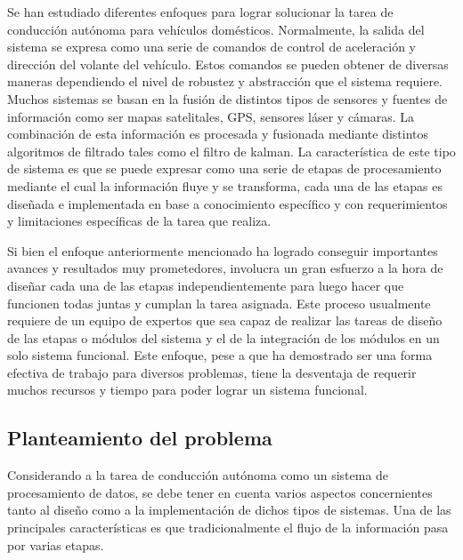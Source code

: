 \documentclass[12pt,letterpaper]{article}
\begin{document}
Se han estudiado diferentes enfoques para lograr solucionar la tarea de 
conducción autónoma para vehículos domésticos. Normalmente, la salida del 
sistema se expresa como una serie de comandos de control de aceleración y dirección 
del volante del vehículo. Estos comandos se pueden obtener de diversas maneras dependiendo 
el nivel de robustez y abstracción que el sistema requiere. Muchos sistemas 
se basan en la fusión de distintos tipos de sensores y fuentes de información como ser 
mapas satelitales, GPS, sensores láser y cámaras. La combinación de esta información 
es procesada y fusionada mediante distintos algoritmos de filtrado tales como el filtro de kalman. 
La característica de este tipo de sistema es que se puede expresar como una serie de etapas 
de procesamiento mediante el cual la información fluye y se transforma, cada una de las etapas es 
diseñada e implementada en base a conocimiento específico y con requerimientos y limitaciones específicas 
de la tarea que realiza. 


Si bien el enfoque anteriormente mencionado ha logrado conseguir importantes avances y resultados 
muy prometedores, involucra un gran esfuerzo a la hora de diseñar cada una de las etapas independientemente 
para luego hacer que funcionen todas juntas y cumplan la tarea asignada. Este proceso usualmente requiere 
de un equipo de expertos que sea capaz de realizar las tareas de diseño de las etapas o módulos del sistema 
y el de la integración de los módulos en un solo sistema funcional. Este enfoque, pese a que ha demostrado ser 
una forma efectiva de trabajo para diversos problemas, tiene la desventaja de requerir muchos 
recursos y tiempo para poder lograr un sistema funcional. 


%
\subsection{Planteamiento del problema}

% 

Considerando a la tarea de conducción autónoma como un sistema de procesamiento de datos, se debe tener en 
cuenta varios aspectos concernientes tanto al diseño como a la implementación de dichos tipos de sistemas. Una 
de las principales características es que tradicionalmente el flujo de la información pasa por varias etapas.
\end{document}
